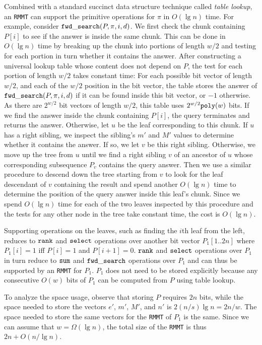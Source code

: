 Combined with a standard succinct data structure technique called {\em table
  lookup}, an {\tt RMMT} can support the primitive operations for $\pi$ in
$O(\lg n)$ time.
For example, consider $\mathtt{fwd\_search}(P,\pi,i,d)$.
We first check the chunk containing $P[i]$ to see if the answer is inside the
same chunk.
This can be done in $O(\lg n)$ time by breaking up the chunk into portions
of length $w/2$ and testing for each portion in turn whether it contains the
answer.
After constructing a universal lookup table whose content does not depend on
$P$, the test for each portion of length $w/2$ takes constant time: For each
possible bit vector of length $w/2$, and each of the $w/2$ position in the bit
vector, the table stores the answer of $\mathtt{fwd\_search}(P,\pi,i,d)$ if it can be
found inside this bit vector, or $-1$ otherwise.
As there are $2^{w/2}$ bit vectors of length $w/2$, this table uses
$2^{w/2}\mathtt{poly}(w)$ bits.
If we find the answer inside the chunk containing $P[i]$, the query terminates
and returns the answer.
Otherwise, let $u$ be the leaf corresponding to this chunk.
If $u$ has a right sibling, we inspect the sibling's $m'$ and $M'$ values to
determine whether it contains the answer.
If so, we let $v$ be this right sibling.
Otherwise, we move up the tree from $u$ until we find a right sibling $v$ of
an ancestor of $u$ whose corresponding subsequence $P_v$ contains the query
answer.
Then we use a similar procedure to descend down the tree starting from $v$ to
look for the leaf descendant of $v$ containing the result and spend another
$O(\lg n)$ time to determine the position of the query answer inside this leaf's
chunk.
Since we spend $O(\lg n)$ time for each of the two leaves inspected by this
procedure and the tests for any other node in the tree take constant time,
the cost is $O(\lg n)$.

Supporting operations on the leaves, such as finding the $i$th leaf from the
left, reduces to $\mathtt{rank}$ and $\mathtt{select}$ operations over another bit vector
$P_1[1..2n]$ where $P_1[i] = 1$ iff $P[i] = 1$ and $P[i+1] = 0$.
$\mathtt{rank}$ and $\mathtt{select}$ operations over $P_1$ in turn reduce to
$\mathtt{sum}$ and $\mathtt{fwd\_search}$ operations over $P_1$ and can thus be supported
by an {\tt RMMT} for $P_1$.
$P_1$ does not need to be stored explicitly because any consecutive $O(w)$ bits
of $P_1$ can be computed from $P$ using table lookup.

To analyze the space usage, observe that storing $P$ requires $2n$ bits, while
the space needed to store the vectors $e'$, $m'$, $M'$, and $n'$ is
$2(n/s) \lg n = 2n/w$.
The space needed to store the same vectors for the {\tt RMMT} of $P_1$ is
the same.
Since we can assume that $w = \Omega(\lg n)$, the total size of the {\tt RMMT}
is thus $2n + O(n / \lg n)$.
